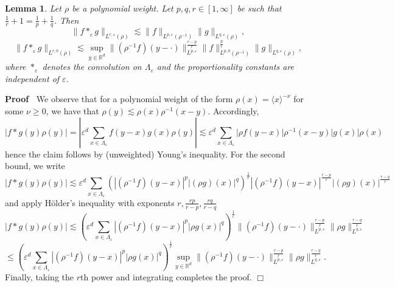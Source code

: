 \documentclass[a4paper,11pt]{article}
\newcommand{\cdummy}{\cdot}
\newenvironment{proof}{\noindent\textbf{Proof\ }}{\hspace*{\fill}$\Box$\medskip}
\newtheorem{lemma}[theorem]{Lemma}
\numberwithin{equation}{section}
\begin{document}
\begin{lemma}
  \label{lem:young}Let $\rho$ be a polynomial weight. Let $p, q, r \in [1,
  \infty]$ be such that $\frac{1}{r} + 1 = \frac{1}{p} + \frac{1}{q}$. Then
  \[ \| f \ast_{\varepsilon} g \|_{L^{r, \varepsilon} (\rho)} \lesssim \| f \|_{L^{p,
     \varepsilon} (\rho^{- 1})} \| g \|_{L^{q, \varepsilon} (\rho)}, \]
  \[ \| f \ast_{\varepsilon} g \|_{L^{r, 0} (\rho)} \lesssim \sup_{y \in \mathbb{R}^d} \|
     (\rho^{- 1} f) (y - \cdummy) \|_{L^{p, \varepsilon}}^{\frac{r - p}{r}} \|
     f \|^{\frac{p}{r}}_{L^{p, 0} (\rho^{- 1})} \| g \|_{L^{q,
     \varepsilon} (\rho)}, \]
     where  $\ast_{\varepsilon}$  denotes the convolution on 
$\Lambda_{\varepsilon}$ and the proportionality constants are independent of $\varepsilon$.
\end{lemma}

\begin{proof}
  We observe that for a polynomial weight of the form $\rho (x) = \langle x
  \rangle^{- \nu}$ for some $\nu \geqslant 0$, we have that $\rho (y)
  \lesssim \rho (x) \rho^{- 1} (x - y)$. Accordingly,
  \[ | f \ast g (y) \rho (y) | = \left| \varepsilon^d \sum_{x \in
     \Lambda_{\varepsilon}} f (y - x) g (x) \rho (y) \right| \lesssim
     \varepsilon^d \sum_{x \in \Lambda_{\varepsilon}} | \rho f (y - x) |
     \rho^{- 1} (x - y) | g (x) | \rho (x) \]
  hence the claim follows by (unweighted) Young's inequality. For the second
  bound, we write
  \[ | f \ast g (y) \rho (y) | \lesssim \varepsilon^d \sum_{x \in
     \Lambda_{\varepsilon}} (| (\rho^{- 1} f) (y - x) |^p | (\rho g) (x)
     |^q)^{\frac{1}{r}} | (\rho^{- 1} f) (y - x) |^{\frac{r - p}{r}} | (\rho
     g) (x) |^{\frac{r - q}{r}} \]
  and apply H{\"o}lder's inequality with exponents $r, \frac{r p}{r - p},
  \frac{r q}{r - q}$
  \[ | f \ast g (y) \rho (y) | \lesssim \left( \varepsilon^d \sum_{x \in
     \Lambda_{\varepsilon}} | (\rho^{- 1} f) (y - x) |^p | \rho g (x) |^q
     \right)^{\frac{1}{r}} \| (\rho^{- 1} f) (y - \cdummy) \|_{L^{p,
     \varepsilon}}^{\frac{r - p}{r}} \| \rho g \|_{L^{q,
     \varepsilon}}^{\frac{r - q}{r}} \]
  \[ \leqslant \left( \varepsilon^d \sum_{x \in \Lambda_{\varepsilon}} |
     (\rho^{- 1} f) (y - x) |^p | \rho g (x) |^q \right)^{\frac{1}{r}} \sup_{y
     \in \mathbb{R}^d} \| (\rho^{- 1} f) (y - \cdummy) \|_{L^{p,
     \varepsilon}}^{\frac{r - p}{r}} \| \rho g \|_{L^{q,
     \varepsilon}}^{\frac{r - q}{r}} . \]
  Finally, taking the $r$th power and integrating completes the proof.
\end{proof}
\end{document}
